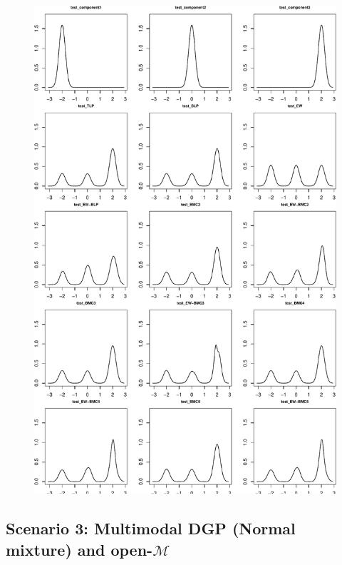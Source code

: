 \documentclass[
]{article}
\begin{document}
\begin{figure}[h]

{\centering \includegraphics{applied_blp_sim_files/figure-latex/unnamed-chunk-15-1} 

}

\end{figure}

\clearpage

\hypertarget{scenario-3-multimodal-dgp-normal-mixture-and-open-mathcalm}{%
\subsection{\texorpdfstring{Scenario 3: Multimodal DGP (Normal mixture)
and
open-\(\mathcal{M}\)}{Scenario 3: Multimodal DGP (Normal mixture) and open-\textbackslash mathcal\{M\}}}\label{scenario-3-multimodal-dgp-normal-mixture-and-open-mathcalm}}
\end{document}

